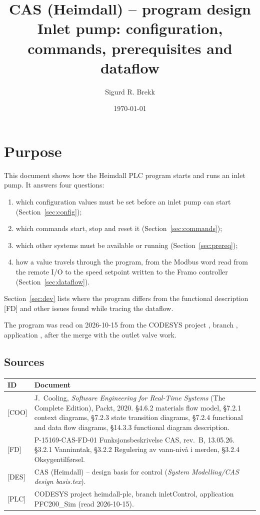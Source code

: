 \documentclass[11pt]{article}
\title{CAS (Heimdall) -- program design\\[1mm]
\large Inlet pump: configuration, commands, prerequisites and dataflow}
\author{Sigurd R. Brekk}
\date{\today}
\begin{document}
\maketitle

\section{Purpose}

This document shows how the Heimdall PLC program starts and runs an inlet pump.
It answers four questions:
\begin{enumerate}
  \item which configuration values must be set before an inlet pump can start (Section~\ref{sec:config});
  \item which commands start, stop and reset it (Section~\ref{sec:commands});
  \item which other systems must be available or running (Section~\ref{sec:prereq});
  \item how a value travels through the program, from the Modbus word read from the remote I/O to
        the speed setpoint written to the Framo controller (Section~\ref{sec:dataflow}).
\end{enumerate}
Section~\ref{sec:dev} lists where the program differs from the functional description [FD] and
other issues found while tracing the dataflow.

The program was read on 2026-10-15 from the CODESYS project , branch
, application , after the merge with the outlet valve work.

\subsection*{Sources}
\begin{tabularx}{\textwidth}{@{}lL@{}}
\toprule
ID & Document \\
\midrule
{[COO]} & J.~Cooling, \emph{Software Engineering for Real-Time Systems} (The Complete Edition),
          Packt, 2020. \S4.6.2 materials flow model, \S7.2.1 context diagrams, \S7.2.3 state
          transition diagrams, \S7.2.4 functional and data flow diagrams, \S14.3.3 functional
          diagram description. \\
{[FD]}  & P-15169-CAS-FD-01 Funksjonsbeskrivelse CAS, rev.~B, 13.05.26. \S3.2.1 Vanninntak,
          \S3.2.2 Regulering av vann-nivå i merden, \S3.2.4 Oksygentilførsel. \\
{[DES]} & CAS (Heimdall) -- design basis for control (\emph{System Modelling/CAS design basis.tex}). \\
{[PLC]} & CODESYS project heimdall-plc, branch inletControl, application PFC200\_Sim (read
          2026-10-15). \\
\bottomrule
\end{tabularx}
\end{document}
